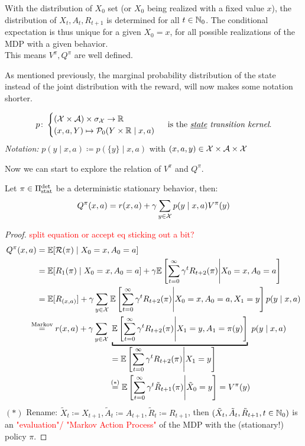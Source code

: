 \begin{remark}
With the distribution of \(X_0\) set (or \(X_0\) being realized with a fixed value \(x\)), the distribution of \(X_t, A_t,R_{t+1}\) is determined for all \(t\in\mathbb{N}_0\). The conditional expectation is thus unique for a given \(X_0=x\), for all possible realizations of the MDP with a given behavior. \\
This means \(V^\pi, Q^\pi\) are well defined.
\end{remark}

As mentioned previously, the marginal probability distribution of the state instead of the joint distribution with the reward, will now makes some notation shorter.  
\begin{definition}
	\[
	p\colon 
	\begin{cases}
		(\mathcal{X}\times\mathcal{A})\times\sigma_{\mathcal{X}}\to\mathbb{R}\\
		(x,a,Y)\mapsto \mathcal{P}_0(Y\times\mathbb{R}\mid x,a)
	\end{cases}\text{ is the \emph{\underline{state} transition kernel}.}
	\] 
\emph{Notation:} \(p(y\mid x,a)\coloneqq p(\{y\}\mid x,a)\) with \((x,a,y)\in\mathcal{X}\times\mathcal{A}\times\mathcal{X}\)
\end{definition}

Now we can start to explore the relation of \(V^\pi\) and \(Q^\pi\).

\begin{prop}\label{expand Q^pi} Let \(\pi\in\Pi_{\textnormal{stat}}^{\textnormal{det}}\) be a deterministic stationary behavior, then:
	\[Q^\pi(x,a)=r(x,a)+\gamma\sum_{y\in\mathcal{X}}p(y\mid x,a)V^\pi(y)	\]
\end{prop}

\begin{proof} \textcolor{red}{split equation or accept eq sticking out a bit?}
\begin{align*}
Q^\pi(x,a) &= \E[\cR(\pi)\mid X_0=x, A_0=a]\\
&=\E[R_1(\pi)\mid X_0=x,A_0=a]+\gamma\E\left[\sum_{t=0}^\infty\gamma^t R_{t+2}(\pi)\middle| X_0=x,A_0=a\right]\\
&=\E[R_{(x,a)}] 
 + \gamma \sum_{y\in\cX}\E\left[\sum_{t=0}^\infty\gamma^t R_{t+2}(\pi) \middle| X_0=x,A_0=a, X_1=y\right]p(y\mid x, a)\\
&\lxeq{\text{Markov}} r(x,a)
 + \gamma\sum_{y\in\cX}\underbracket{\E\left[\sum_{t=0}^\infty\gamma^t R_{t+2}(\pi)\middle| X_1=y, A_1=\pi(y)\right]}_{
 \begin{aligned}
 	&= \E\left[\sum_{t=0}^\infty\gamma^t R_{t+2}(\pi)\middle| X_1=y \right] \\
 	&\lxeq{(*)} \E\left[\sum_{t=0}^\infty\gamma^t \tilde{R}_{t+1}(\pi)\middle| \tilde{X}_0=y \right]=V^\pi(y)
 \end{aligned}
 }
 p(y\mid x, a)
\end{align*}
\((*)\) Rename: \(\tilde{X}_{t}\coloneqq X_{t+1}, \tilde{A}_t\coloneqq A_{t+1},\tilde{R}_{t}\coloneqq R_{t+1}\), then \((\tilde{X}_t,\tilde{A}_t,\tilde{R}_{t+1}, t\in\mathbb{N}_0)\) is an \textcolor{red}{"evaluation"/ "Markov Action Process"} of the MDP with the (stationary!) policy \(\pi\).
\end{proof}


